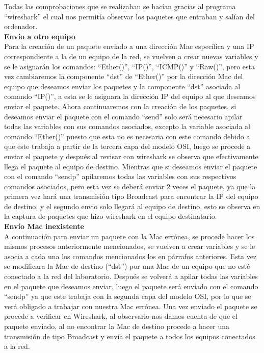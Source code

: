 \documentclass{udpreport}
\begin{document}
		Todas las comprobaciones que se realizaban se hacían gracias al programa “wireshark” el cual nos permitía observar los
		paquetes que entraban y salían del ordenador.\\
		{\bf \large Envío a otro equipo}\\
		Para la creación de un paquete enviado a una dirección Mac específica y una IP correspondiente a la de un equipo de la
		red, se vuelven a crear nuevas variables y se le asignarán los comandos: “Ether()”, “IP()”, “ICMP()” y “Raw()”, pero
		esta vez cambiaremos la componente “dst” de “Ether()” por la dirección Mac del equipo que deseamos enviar los paquetes
		y la componente “dst” asociada al comando “IP()”, a esta se le asignara la dirección IP del equipo al que deseamos
		enviar el paquete. Ahora continuaremos con la creación de los paquetes, si deseamos enviar el paquete con el comando
		“send” solo será necesario apilar todas las variables con sus comandos asociados, excepto la variable asociada al
		comando “Ether()” puesto que esta no es necesaria con este comando debido a que este trabaja a partir de la tercera
		capa del modelo OSI, luego se procede a enviar el paquete y  después al revisar con wireshark se observa que
		efectivamente llega el paquete al equipo de destino. Mientras que si deseamos enviar el paquete con el comando “sendp”
		apilaremos todas las variables con sus respectivos comandos asociados,  pero esta vez se deberá enviar 2 veces el
		paquete, ya que la primera vez hará una transmisión tipo Broadcast para encontrar la IP del equipo de destino, y el
		segundo envio solo llegará al equipo de destino, esto se observa en la captura de paquetes que hizo wireshark en el
		equipo destinatario.\\
		{\bf \large Envío Mac inexistente}\\
		A continuación para enviar un paquete con la Mac errónea, se procede hacer los mismos procesos anteriormente
		mencionados, se vuelven a crear variables y se le asocia a cada una los comandos mencionados los en párrafos
		anteriores. Esta vez se modificara la Mac de destino (“dst”)  por una Mac de un equipo que no esté conectado a la red
		del laboratorio. Después se volverá a apilar todas las variables en el paquete que deseamos enviar, luego el paquete
		será enviado con el comando “sendp” ya que este trabaja con la segunda capa del modelo OSI, por lo que se verá
		obligado a trabajar con nuestra Mac errónea. Una vez enviado el paquete se procede a verificar en Wireshark, al
		observarlo nos damos cuenta de que el paquete enviado, al no encontrar la Mac de destino procede a hacer una
		transmisión de tipo Broadcast y envía el paquete a todos los equipos conectados a la red.\\
\end{document}
